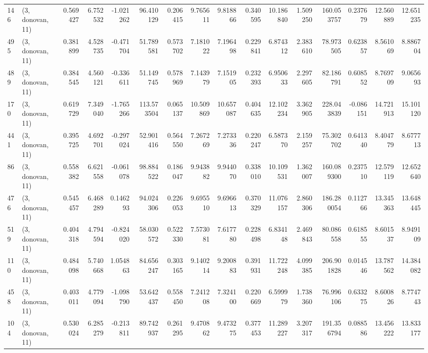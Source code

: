 \begin{tabular}{llrrrrrrrrrrrrrr}
146 &  (3, donovan, 11) &   0.569427 &   6.752532 &  -1.021262 &    96.410129 &   0.206415 &   9.765611 &   9.818866 &  0.340595 &  10.186840 &   1.509250 &   160.053757 &  0.237679 &  12.560889 &  12.651235 \\
495 &  (3, donovan, 11) &   0.381899 &   4.528735 &  -0.471704 &    51.789581 &   0.573702 &   7.181022 &   7.196498 &  0.229841 &   6.874312 &   2.383610 &    78.973505 &  0.623857 &   8.561069 &   8.886704 \\
489 &  (3, donovan, 11) &   0.384545 &   4.560121 &  -0.336611 &    51.149745 &   0.578969 &   7.143979 &   7.151905 &  0.232393 &   6.950633 &   2.297605 &    82.186791 &  0.608552 &   8.769709 &   9.065693 \\
170 &  (3, donovan, 11) &   0.619729 &   7.349040 &  -1.765266 &   113.573504 &   0.065137 &  10.509869 &  10.657087 &  0.404635 &  12.102234 &   3.362905 &   228.043839 & -0.086151 &  14.721913 &  15.101120 \\
441 &  (3, donovan, 11) &   0.395725 &   4.692701 &  -0.297024 &    52.901416 &   0.564550 &   7.267269 &   7.273336 &  0.220247 &   6.587370 &   2.159257 &    75.302702 &  0.641340 &   8.404779 &   8.677713 \\
86  &  (3, donovan, 11) &   0.558382 &   6.621558 &  -0.061078 &    98.884522 &   0.186047 &   9.943882 &   9.944070 &  0.338010 &  10.109531 &   1.362007 &   160.089300 &  0.237510 &  12.579119 &  12.652640 \\
476 &  (3, donovan, 11) &   0.545457 &   6.468289 &   0.146293 &    94.024306 &   0.226053 &   9.695510 &   9.696613 &  0.370329 &  11.076157 &   2.860306 &   186.280054 &  0.112766 &  13.345363 &  13.648445 \\
519 &  (3, donovan, 11) &   0.404318 &   4.794594 &  -0.824020 &    58.030572 &   0.522330 &   7.573081 &   7.617780 &  0.228498 &   6.834148 &   2.469843 &    80.086558 &  0.618555 &   8.601537 &   8.949109 \\
110 &  (3, donovan, 11) &   0.484098 &   5.740668 &   1.054863 &    84.656247 &   0.303165 &   9.140214 &   9.200883 &  0.391931 &  11.722248 &   4.099385 &   206.901828 &  0.014546 &  13.787562 &  14.384082 \\
458 &  (3, donovan, 11) &   0.403011 &   4.779094 &  -1.098790 &    53.642437 &   0.558450 &   7.241208 &   7.324100 &  0.220669 &   6.599979 &   1.738360 &    76.996106 &  0.633275 &   8.600826 &   8.774743 \\
104 &  (3, donovan, 11) &   0.530024 &   6.285279 &  -0.213811 &    89.742937 &   0.261295 &   9.470862 &   9.473275 &  0.377453 &  11.289227 &   3.207317 &   191.356794 &  0.088586 &  13.456222 &  13.833177 \\

\end{tabular}
